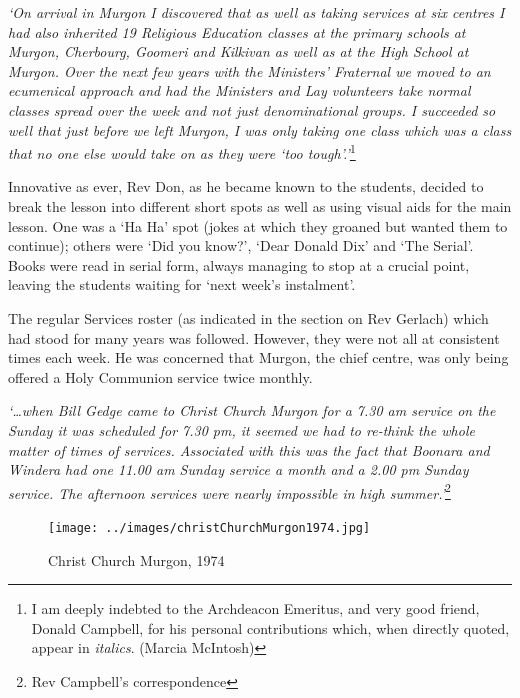 \emph{`On arrival in Murgon I discovered that as well as taking services at six centres I had also inherited 19 Religious Education classes at the primary schools at Murgon, Cherbourg, Goomeri and Kilkivan as well as at the High School at Murgon. Over the next few years with the Ministers' Fraternal we moved to an ecumenical approach and had the Ministers and Lay volunteers take normal classes spread over the week and not just denominational groups. I succeeded so well that just before we left Murgon, I was only taking one class which was a class that no one else would take on as they were `too tough'.'}\footnote{I am deeply indebted to the Archdeacon Emeritus, and very good friend, Donald Campbell, for his personal contributions which, when directly quoted, appear in \emph{italics}. (Marcia McIntosh)}


Innovative as ever, Rev Don, as he became known to the students, decided to break the lesson into different short spots as well as using visual aids for the main lesson. One was a `Ha Ha' spot (jokes at which they groaned but wanted them to continue); others were `Did you know?', `Dear Donald Dix' and `The Serial'. Books were read in serial form, always managing to stop at a crucial point, leaving the students waiting for `next week's instalment'.



The regular Services roster (as indicated in the section on Rev Gerlach) which had stood for many years was followed. However, they were not all at consistent times each week. He was concerned that Murgon, the chief centre, was only being offered a Holy Communion service twice monthly.



\emph{`\ldots when Bill Gedge came to Christ Church Murgon for a 7.30 am service on the Sunday it was scheduled for 7.30 pm, it seemed we had to re-think the whole matter of times of services. Associated with this was the fact that Boonara and Windera had one 11.00 am Sunday service a month and a 2.00 pm Sunday service. The afternoon services were nearly impossible in high summer.'}\footnote{Rev Campbell's correspondence}








\begin{figure}
\begin{center}
\texttt{[image: ../images/christChurchMurgon1974.jpg]}
\caption{Christ Church Murgon, 1974}
\end{center}
\end{figure}




